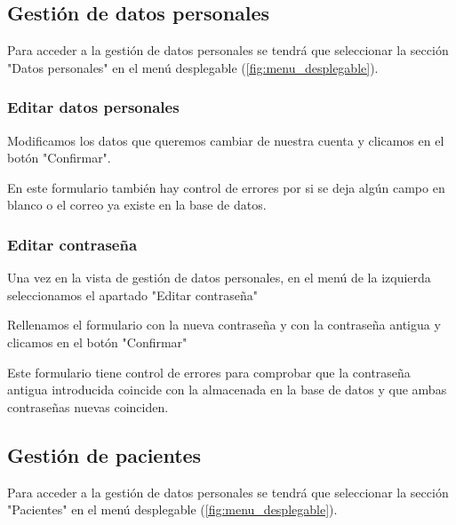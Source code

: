 \subsection{Gestión de datos personales}

Para acceder a la gestión de datos personales se tendrá que seleccionar la sección "Datos personales"{} en el menú desplegable (\ref{fig:menu_desplegable}).


\subsubsection{Editar datos personales}

Modificamos los datos que queremos cambiar de nuestra cuenta y clicamos en el botón "{}Confirmar". 


En este formulario también hay control de errores por si se deja algún campo en blanco o el correo ya existe en la base de datos.

\subsubsection{Editar contraseña}

Una vez en la vista de gestión de datos personales, en el menú de la izquierda seleccionamos el apartado "{}Editar contraseña"


Rellenamos el formulario con la nueva contraseña y con la contraseña antigua y clicamos en el botón "{}Confirmar" 


Este formulario tiene control de errores para comprobar que la contraseña antigua introducida coincide con la almacenada en la base de datos y que ambas contraseñas nuevas coinciden. 

\subsection{Gestión de pacientes}

Para acceder a la gestión de datos personales se tendrá que seleccionar la sección "Pacientes"{} en el menú desplegable (\ref{fig:menu_desplegable}).

